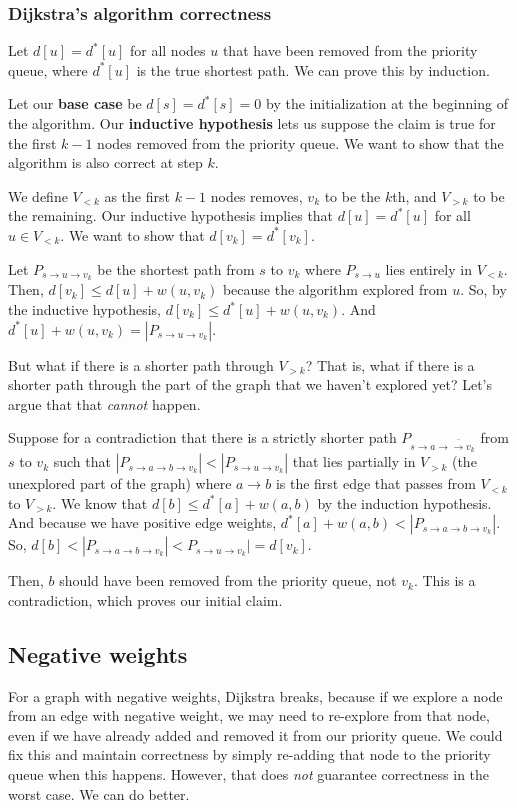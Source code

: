 \documentclass[titlepage, 12pt, leqno]{article}
\begin{document}
\subsubsection{Dijkstra's algorithm correctness}
Let $d[u] = d^{*}[u]$ for all nodes $u$ that have been removed from the priority
queue, where $d^{*}[u]$ is the true shortest path. We can prove this by induction.

Let our \textbf{base case} be $d[s] = d^{*}[s] = 0$ by the initialization at the
beginning of the algorithm. Our \textbf{inductive hypothesis} lets us suppose 
the claim is true for the first $k-1$ nodes removed from the priority queue.
We want to show that the algorithm is also correct at step $k$.

We define $V_{<k}$ as the first $k-1$ nodes removes, $v_{k}$ to be the $k$th,
and $V_{>k}$ to be the remaining. Our inductive hypothesis implies that
$d[u] = d^{*}[u]$ for all $u \in V_{<k}$. We want to show that $d[v_{k}] = 
d^{*}[v_{k}]$.

Let $P_{s\rightarrow u\rightarrow v_{k}}$ be the shortest path from $s$ to
$v_{k}$ where $P_{s\rightarrow u}$ lies entirely in $V_{<k}$. Then, $d[v_{k}] \le
d[u] + w(u,v_{k})$ because the algorithm explored from $u$. So, by the inductive
hypothesis, $d[v_{k}] \le d^{*}[u] + w(u,v_{k})$. And $d^{*}[u] + w(u,v_{k}) =
|P_{s\rightarrow u \rightarrow v_{k}}|$.

But what if there is a shorter path through $V_{>k}$? That is, what if there is
a shorter path through the part of the graph that we haven't explored yet? Let's
argue that that \textit{cannot }happen.

Suppose for a contradiction that there is a strictly shorter path 
$P_{s\rightarrow a \rightarrow \bar \rightarrow v_{k}}$ from $s$ to $v_{k}$
such that $|P_{s\rightarrow a\rightarrow b \rightarrow v_{k}}| <
|P_{s\rightarrow u\rightarrow v_{k}}|$ that lies partially in $V_{>k}$ (the
unexplored part of the graph) where $a\rightarrow b$ is the first edge that
passes from $V_{<k}$ to $V_{>k}$. We know that $d[b] \le d^{*}[a] + w(a,b)$ by
the induction hypothesis. And because we have positive edge weights,
$d^{*}[a] + w(a,b) < |P_{s\rightarrow a\rightarrow b \rightarrow v_{k}}|$.
So, $d[b] < |P_{s\rightarrow a\rightarrow b \rightarrow v_{k}}| <
P_{s\rightarrow u\rightarrow v_{k}}| = d[v_{k}]$.

Then, $b$ should have been removed from the priority queue, not $v_{k}$. This
is a contradiction, which proves our initial claim.

\subsection{Negative weights}
For a graph with negative weights, Dijkstra breaks, because if we explore a
node from an edge with negative weight, we may need to re-explore from that 
node, even if we have already added and removed it from our priority queue. We
could fix this and maintain correctness by simply re-adding that node to the
priority queue when this happens. However, that does \textit{not} guarantee
correctness in the worst case. We can do better.
\end{document}
